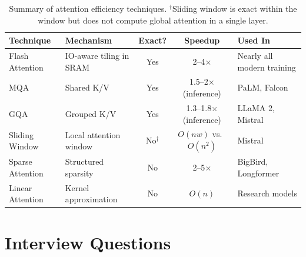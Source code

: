 \begin{table}[H]
\centering
\small
\begin{tabularx}{\textwidth}{@{}l l c c X@{}}
\toprule
\textbf{Technique} & \textbf{Mechanism} & \textbf{Exact?} & \textbf{Speedup} & \textbf{Used In} \\
\midrule
Flash Attention  & IO-aware tiling in SRAM  & Yes & 2--4$\times$ & Nearly all modern training \\
MQA              & Shared K/V              & Yes & 1.5--2$\times$ (inference) & PaLM, Falcon \\
GQA              & Grouped K/V             & Yes & 1.3--1.8$\times$ (inference) & LLaMA 2, Mistral \\
Sliding Window   & Local attention window   & No$^\dagger$ & $O(nw)$ vs.\ $O(n^2)$ & Mistral \\
Sparse Attention & Structured sparsity     & No  & 2--5$\times$ & BigBird, Longformer \\
Linear Attention & Kernel approximation    & No  & $O(n)$ & Research models \\
\bottomrule
\end{tabularx}
\caption{Summary of attention efficiency techniques.  $^\dagger$Sliding window is
exact within the window but does not compute global attention in a single layer.}
\label{tab:efficiency-summary}
\end{table}


\section{Interview Questions}
\label{sec:transformer-questions}

